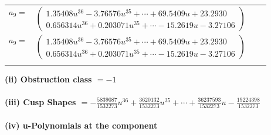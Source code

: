\documentclass[1p]{elsarticle_modified}
\theoremstyle{definition}
\begin{document}
\begin{tabular}{m{7pt} m{180pt} m{7pt} m{180pt} }
\flushright $a_{9}=$&$\begin{pmatrix}1.35408 u^{36}-3.76576 u^{35}+\cdots+69.5409 u+23.2930\\0.656314 u^{36}+0.203071 u^{35}+\cdots-15.2619 u-3.27106\end{pmatrix}$\\ \flushright $a_{9}=$&$\begin{pmatrix}1.35408 u^{36}-3.76576 u^{35}+\cdots+69.5409 u+23.2930\\0.656314 u^{36}+0.203071 u^{35}+\cdots-15.2619 u-3.27106\end{pmatrix}$\\&\end{tabular}
\flushleft \textbf{(ii) Obstruction class $= -1$}\\~\\
\flushleft \textbf{(iii) Cusp Shapes $= -\frac{5839087}{1532273} u^{36}+\frac{3620132}{1532273} u^{35}+\cdots+\frac{36237593}{1532273} u-\frac{19224398}{1532273}$}\\~\\
\newpage\renewcommand{\arraystretch}{1}
\flushleft \textbf{(iv) u-Polynomials at the component}\newline \\
\end{document}
